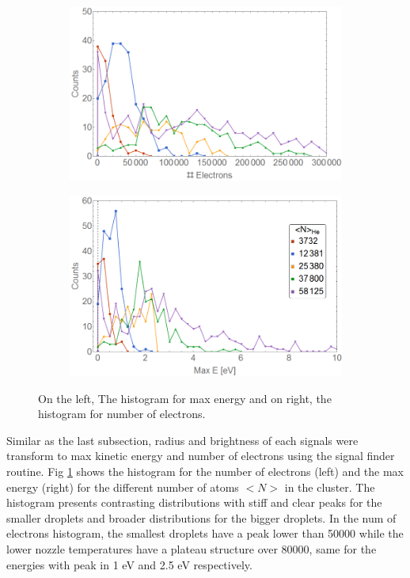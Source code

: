 \begin{figure}[h!]
\centering
\begin{subfigure}[l]{0.49\textwidth}
\includegraphics[width=1\textwidth]{../Images/results/NI_He_Dropletsize/HElectrones.png}   				\end{subfigure}
\begin{subfigure}[l]{0.49\textwidth}
\includegraphics[width=1\textwidth]{../Images/results/NI_He_Dropletsize/HEnerg2.png} 
\end{subfigure}
\caption[NIR He droplet size. histograms]{On the left, The histogram for max energy and on right, the histogram for number of electrons.}
\label{fig:NIRHehistosize}
\end{figure}

Similar as the last subsection, radius and brightness of each signals were transform to max kinetic energy and number of electrons using the signal finder routine. Fig \ref{fig:NIRHehistosize} shows the histogram for the number of electrons (left) and the max energy (right) for the different number of atoms $<N>$ in the cluster. The histogram presents contrasting distributions with stiff and clear peaks for the smaller droplets and broader distributions for the bigger droplets. In the num of electrons histogram, the smallest droplets have a peak lower than 50000 while the lower nozzle temperatures have a plateau structure over 80000, same for the energies with peak in 1 eV and 2.5 eV respectively.

